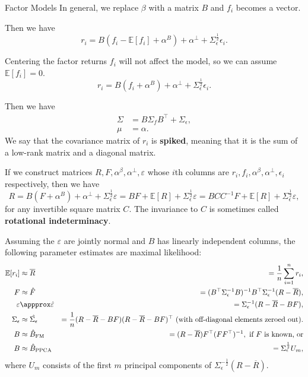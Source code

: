 \documentclass{beamer}
\begin{document}
\begin{frame}{Factor Models}
	In general, we replace $\beta$ with a matrix $B$ and $f_i$ becomes a vector.

	Then we have
	$$r_i = B(f_i-\mathbb{E}[f_i] + \alpha^B) + \alpha^\bot + \Sigma_\epsilon^\frac{1}{2}\epsilon_i.$$

	Centering the factor returns $f_i$ will not affect the model, so we can assume $\mathbb{E}[f_i]=0$.
	$$r_i = B(f_i + \alpha^B) + \alpha^\bot + \Sigma_\epsilon^\frac{1}{2}\epsilon_i.$$

	Then we have
	\begin{align*}
		\Sigma	&= B \Sigma_f B^\top + \Sigma_\epsilon,
	\\	\mu	&= \alpha.
	\end{align*}
	We say that the covariance matrix of $r_i$ is \textbf{spiked}, meaning that it is the sum of a low-rank matrix and a diagonal matrix.

	If we construct matrices $R,F,\alpha^\beta,\alpha^\bot,\varepsilon$ whose $i$th columns are $r_i,f_i,\alpha^\beta,\alpha^\bot,\epsilon_i$ respectively, then we have
	$$R = B(F + \alpha^B) + \alpha^\bot + \Sigma_\epsilon^\frac{1}{2}\varepsilon = BF + \mathbb{E}[R] + \Sigma_\epsilon^\frac{1}{2}\varepsilon = BCC^{-1}F + \mathbb{E}[R] + \Sigma_\epsilon^\frac{1}{2}\varepsilon,$$
	for any invertible square matrix $C$. The invariance to $C$ is sometimes called \textbf{rotational indeterminacy}.

	Assuming the $\varepsilon$ are jointly normal and $B$ has linearly independent columns, the following parameter estimates are maximal likelihood:
	\begin{align*}
		\mathbb{E}[r_i]	&\approx \overline{R}		&= \frac{1}{n}\sum_{i=1}^n r_i,
	\\	F			&\approx \hat{F}		&= (B^\top \Sigma_\epsilon^{-1} B)^{-1}B^\top \Sigma_\epsilon^{-1}(R-\overline{R}),
	\\	\varepsilon		&\appprox \hat{\varepsilon}	&= \Sigma_\epsilon^{-1} (R-\overline{R}-BF),
	\\	\Sigma_\epsilon		&\approx \hat{\Sigma_\epsilon}	&= \frac{1}{n}(R-\overline{R}-BF)(R-\overline{R}-BF)^\top \textrm{ (with off-diagonal elements zeroed out)}.
	\\	B			&\approx \hat{B}_\textrm{FM}	&= (R-\overline{R})F^\top (FF^\top)^{-1},\textrm{ if }F\textrm{ is known, or}%
	\\	B			&\approx \hat{B}_\textrm{PPCA}	&= \Sigma_\epsilon^\frac{1}{2} U_m,%
	\end{align*}
	where $U_m$ consists of the first $m$ principal components of $\Sigma_\epsilon^{-\frac{1}{2}}(R-\overline{R})$.%


\end{frame}
\end{document}
